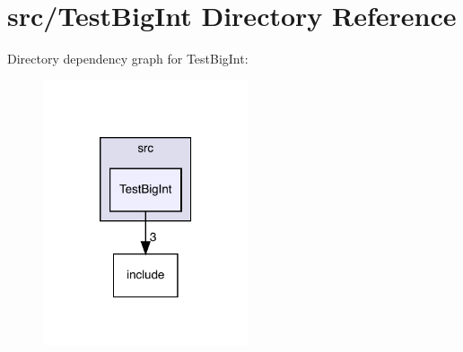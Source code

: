 \section{src/\+Test\+Big\+Int Directory Reference}
\label{dir_2174880164a8a2c1d6599a4ba33555e0}
Directory dependency graph for Test\+Big\+Int\+:
\nopagebreak
\begin{figure}[H]
\begin{center}
\leavevmode
\includegraphics[width=172pt]{dir_2174880164a8a2c1d6599a4ba33555e0_dep}
\end{center}
\end{figure}
